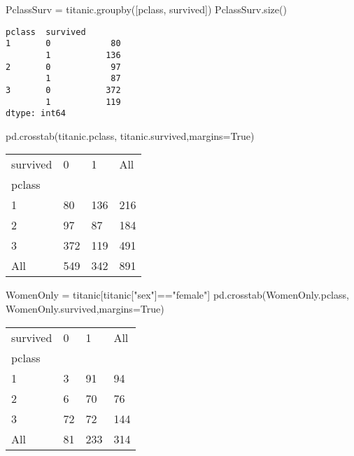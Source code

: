 \documentclass[
  letterpaper,
  DIV=11,
  numbers=noendperiod]{scrreprt}
\newenvironment{Shaded}{\begin{snugshade}}{\end{snugshade}}
\newcommand{\NormalTok}[1]{\textcolor[rgb]{0.00,0.23,0.31}{#1}}
\newcommand{\OperatorTok}[1]{\textcolor[rgb]{0.37,0.37,0.37}{#1}}
\newcommand{\StringTok}[1]{\textcolor[rgb]{0.13,0.47,0.30}{#1}}
\newcommand{\VariableTok}[1]{\textcolor[rgb]{0.07,0.07,0.07}{#1}}
\begin{document}
\begin{Shaded}
\begin{Highlighting}[]
\NormalTok{PclassSurv }\OperatorTok{=}\NormalTok{ titanic.groupby([}\StringTok{\textquotesingle{}pclass\textquotesingle{}}\NormalTok{, }\StringTok{\textquotesingle{}survived\textquotesingle{}}\NormalTok{])}
\NormalTok{PclassSurv.size()}
\end{Highlighting}
\end{Shaded}

\begin{verbatim}
pclass  survived
1       0            80
        1           136
2       0            97
        1            87
3       0           372
        1           119
dtype: int64
\end{verbatim}

\begin{Shaded}
\begin{Highlighting}[]
\NormalTok{pd.crosstab(titanic.pclass, titanic.survived,margins}\OperatorTok{=}\VariableTok{True}\NormalTok{)}
\end{Highlighting}
\end{Shaded}

\begin{longtable}[]{@{}llll@{}}
\toprule()
survived & 0 & 1 & All \\
pclass & & & \\
\midrule()
\endhead
1 & 80 & 136 & 216 \\
2 & 97 & 87 & 184 \\
3 & 372 & 119 & 491 \\
All & 549 & 342 & 891 \\
\bottomrule()
\end{longtable}

\begin{Shaded}
\begin{Highlighting}[]
\NormalTok{WomenOnly }\OperatorTok{=}\NormalTok{ titanic[titanic[}\StringTok{"sex"}\NormalTok{]}\OperatorTok{==}\StringTok{"female"}\NormalTok{]}
\NormalTok{pd.crosstab(WomenOnly.pclass, WomenOnly.survived,margins}\OperatorTok{=}\VariableTok{True}\NormalTok{)}
\end{Highlighting}
\end{Shaded}

\begin{longtable}[]{@{}llll@{}}
\toprule()
survived & 0 & 1 & All \\
pclass & & & \\
\midrule()
\endhead
1 & 3 & 91 & 94 \\
2 & 6 & 70 & 76 \\
3 & 72 & 72 & 144 \\
All & 81 & 233 & 314 \\
\bottomrule()
\end{longtable}
\end{document}
